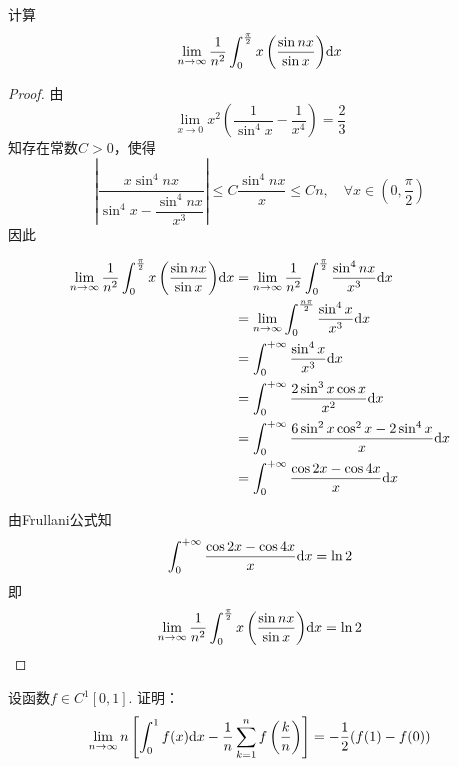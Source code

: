 \begin{proposition}

    计算
    \[\lim\limits_{n \to \infty}{\dfrac{1}{n^2}\int_{0}^{\frac{\pi}{2}}{x\left( \dfrac{\sin{nx}}{\sin{x}} \right)}}\mathrm{d} x\]

\end{proposition}

\begin{proof}

    由
    \[\lim\limits_{x \to 0}{x^2\left( \dfrac{1}{\sin^4{x}} - \dfrac{1}{x^4} \right)} = \dfrac{2}{3}\]
    知存在常数$C > 0$，使得
    \[\left| \dfrac{x\sin^4{nx}}{\sin^4{x} - \dfrac{\sin^4{nx}}{x^3}} \right| \leq C\dfrac{\sin^4{nx}}{x} \leq Cn, \quad \forall x \in \left( 0, \dfrac{\pi}{2} \right)\]
    因此

    \begin{align*}
        \lim\limits_{n \to \infty}{\dfrac{1}{n^2}\int_{0}^{\frac{\pi}{2}}{x\left( \dfrac{\sin{nx}}{\sin{x}} \right)}}\mathrm{d} x & = \lim\limits_{n \to \infty}{\dfrac{1}{n^2}\int_{0}^{\frac{\pi}{2}}{\dfrac{\sin^4{nx}}{x^3}\mathrm{d} x}} \\
        & = \lim\limits_{n \to \infty}{\int_{0}^{\frac{n\pi}{2}}{\dfrac{\sin^4{x}}{x^3}}\mathrm{d} x} \\
        & = \int_{0}^{+\infty}{\dfrac{\sin^4{x}}{x^3}}\mathrm{d} x \\
        & = \int_{0}^{+\infty}{\dfrac{2\sin^3{x}\cos{x}}{x^2}}\mathrm{d} x \\
        & = \int_{0}^{+\infty}{\dfrac{6\sin^2{x}\cos^2{x} - 2\sin^4{x}}{x}}\mathrm{d} x \\
        & = \int_{0}^{+\infty}{\dfrac{\cos{2x} - \cos{4x}}{x}}\mathrm{d} x
    \end{align*}

    由\textup{Frullani}公式知
    \[\int_{0}^{+\infty}{\dfrac{\cos{2x} - \cos{4x}}{x}}\mathrm{d} x = \ln{2}\]
    即
    \[\lim\limits_{n \to \infty}{\dfrac{1}{n^2}\int_{0}^{\frac{\pi}{2}}{x\left( \dfrac{\sin{nx}}{\sin{x}} \right)}}\mathrm{d} x = \ln{2}\]

\end{proof}


\begin{proposition}

    设函数$f \in C^{1}[0, 1]$. 证明：
    \[\lim\limits_{n \to \infty}{n \left[ \int_{0}^{1}{f(x)}\mathrm{d} x - \dfrac{1}{n}\sum\limits_{k = 1}^{n}{f\left( \dfrac{k}{n} \right)} \right]} = -\dfrac{1}{2}(f(1) - f(0))\]

\end{proposition}

